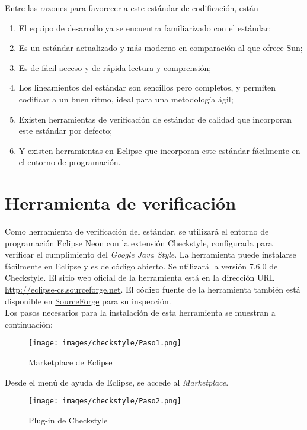 \documentclass{scrreprt}
\begin{document}
Entre las razones para favorecer a este estándar de codificación, están

\begin{enumerate}[label=\alph*.]
	\item El equipo de desarrollo ya se encuentra familiarizado con el estándar;
    \item Es un estándar actualizado y más moderno en comparación al que ofrece Sun;
    \item Es de fácil acceso y de rápida lectura y comprensión;
    \item Los lineamientos del estándar son sencillos pero completos, y permiten codificar a un buen ritmo, ideal para una metodología ágil;
    \item Existen herramientas de verificación de estándar de calidad que incorporan este estándar por defecto;
    \item Y existen herramientas en Eclipse que incorporan este estándar fácilmente en el entorno de programación.
\end{enumerate}


\section{Herramienta de verificación}

Como herramienta de verificación del estándar, se utilizará el entorno de programación Eclipse Neon con la extensión Checkstyle, configurada para verificar el cumplimiento del \textit{Google Java Style}. La herramienta puede instalarse fácilmente en Eclipse y es de código abierto. Se utilizará la versión 7.6.0 de Checkstyle. El sitio web oficial de la herramienta está en la dirección URL \href{http://eclipse-cs.sourceforge.net}{http://eclipse-cs.sourceforge.net}. El código fuente de la herramienta también está disponible en \href{https://sourceforge.net/p/eclipse-cs/git/ci/master/tree/}{SourceForge} para su inspección.\\

Los pasos necesarios para la instalación de esta herramienta se muestran a continuación:

\begin{figure}[H]
	\centering
    \texttt{[image: images/checkstyle/Paso1.png]}
    \caption{Marketplace de Eclipse}\label{}
\end{figure}

Desde el menú de ayuda de Eclipse, se accede al \textit{Marketplace}.

\begin{figure}[H]
	\centering
    \texttt{[image: images/checkstyle/Paso2.png]}
    \caption{Plug-in de Checkstyle}\label{}
\end{figure}
\end{document}
